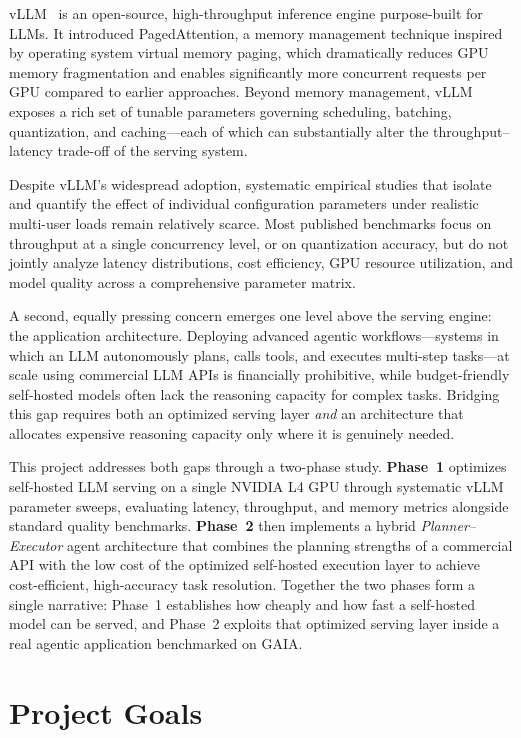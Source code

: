 \documentclass[a4paper,12pt]{report}
\begin{document}
vLLM~\cite{kwon2023efficient} is an open-source, high-throughput inference engine purpose-built for LLMs. It introduced PagedAttention, a memory management technique inspired by operating system virtual memory paging, which dramatically reduces GPU memory fragmentation and enables significantly more concurrent requests per GPU compared to earlier approaches. Beyond memory management, vLLM exposes a rich set of tunable parameters governing scheduling, batching, quantization, and caching---each of which can substantially alter the throughput--latency trade-off of the serving system.

Despite vLLM's widespread adoption, systematic empirical studies that isolate and quantify the effect of individual configuration parameters under realistic multi-user loads remain relatively scarce. Most published benchmarks focus on throughput at a single concurrency level, or on quantization accuracy, but do not jointly analyze latency distributions, cost efficiency, GPU resource utilization, and model quality across a comprehensive parameter matrix.

A second, equally pressing concern emerges one level above the serving engine: the application architecture. Deploying advanced agentic workflows---systems in which an LLM autonomously plans, calls tools, and executes multi-step tasks---at scale using commercial LLM APIs is financially prohibitive, while budget-friendly self-hosted models often lack the reasoning capacity for complex tasks. Bridging this gap requires both an optimized serving layer \emph{and} an architecture that allocates expensive reasoning capacity only where it is genuinely needed.

This project addresses both gaps through a two-phase study. \textbf{Phase~1} optimizes self-hosted LLM serving on a single NVIDIA L4 GPU through systematic vLLM parameter sweeps, evaluating latency, throughput, and memory metrics alongside standard quality benchmarks. \textbf{Phase~2} then implements a hybrid \emph{Planner--Executor} agent architecture that combines the planning strengths of a commercial API with the low cost of the optimized self-hosted execution layer to achieve cost-efficient, high-accuracy task resolution. Together the two phases form a single narrative: Phase~1 establishes how cheaply and how fast a self-hosted model can be served, and Phase~2 exploits that optimized serving layer inside a real agentic application benchmarked on GAIA.

\section{Project Goals}
\end{document}

